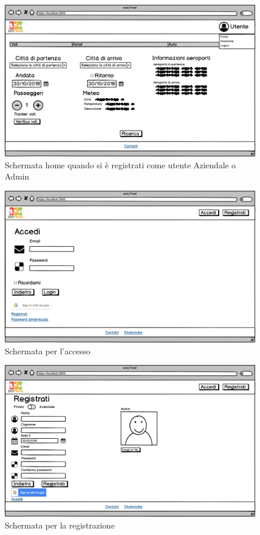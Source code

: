 \documentclass[11pt]{article}
\begin{document}
\begin{figure}[!ht]
	\includegraphics[width=1\textwidth]{./Mockup/Voli-aziendale-admin} %
	\caption{Schermata home quando si è registrati come utente Aziendale o Admin}
	\label{fig:homeaziendaleadmin}
\end{figure}

\begin{figure}[!ht]
	\includegraphics[width=1\textwidth]{./Mockup/Accesso} %
	\caption{Schermata per l'accesso}
	\label{fig:accesso}
\end{figure}

\begin{figure}[!ht]
	\includegraphics[width=1\textwidth]{./Mockup/Registrazione} %
	\caption{Schermata per la registrazione}
	\label{fig:registrazione}
\end{figure}
\end{document}
